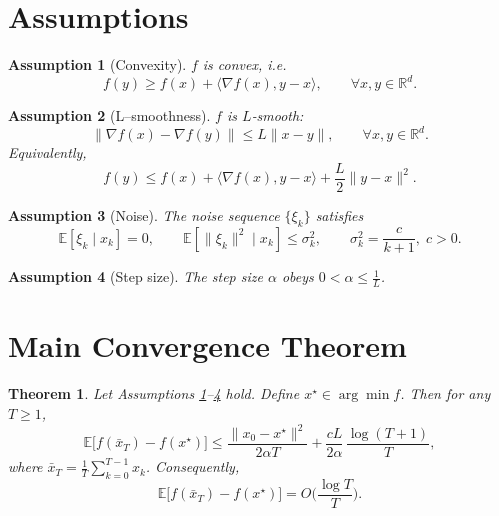 \documentclass{article}
\newtheorem{theorem}{Theorem}
\newtheorem{assumption}{Assumption}
\newcommand{\E}{\mathbb{E}}
\begin{document}
\newpage

\section*{Assumptions}
\begin{assumption}[Convexity]\label{ass:convex}
$f$ is convex, i.e.
\[
f(y)\ge f(x)+\langle\nabla f(x),y-x\rangle,\qquad\forall x,y\in\mathbb{R}^d.
\]
\end{assumption}
\begin{assumption}[L–smoothness]\label{ass:smooth}
$f$ is $L$‑smooth:
\[
\|\nabla f(x)-\nabla f(y)\|\le L\|x-y\|,\qquad\forall x,y\in\mathbb{R}^d.
\]
Equivalently,
\[
f(y)\le f(x)+\langle\nabla f(x),y-x\rangle+\frac{L}{2}\|y-x\|^2.
\]
\end{assumption}
\begin{assumption}[Noise]\label{ass:noise}
The noise sequence $\{\xi_k\}$ satisfies
\[
\E[\xi_k\mid x_k]=0,\qquad
\E[\|\xi_k\|^2\mid x_k]\le\sigma_k^2,\qquad
\sigma_k^2=\frac{c}{k+1},\;c>0.
\]
\end{assumption}
\begin{assumption}[Step size]\label{ass:step}
The step size $\alpha$ obeys $0<\alpha\le \frac{1}{L}$.
\end{assumption}

\section*{Main Convergence Theorem}
\begin{theorem}\label{thm:main}
Let Assumptions \ref{ass:convex}--\ref{ass:step} hold.  
Define $x^\star\in\arg\min f$.  Then for any $T\ge 1$,
\[
\E\!\bigl[f(\bar{x}_T)-f(x^\star)\bigr]\le
\frac{\|x_0-x^\star\|^2}{2\alpha T}
+\frac{cL}{2\alpha}\,\frac{\log (T+1)}{T},
\]
where $\displaystyle\bar{x}_T=\frac1T\sum_{k=0}^{T-1}x_k$.
Consequently,
\[
\E\!\bigl[f(\bar{x}_T)-f(x^\star)\bigr]=O\!\biggl(\frac{\log T}{T}\biggr).
\]
\end{theorem}
\end{document}
